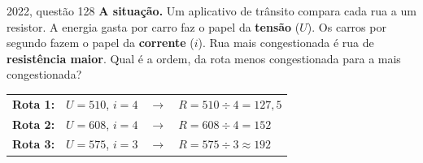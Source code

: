 \begin{enemreal}{2022, questão 128}
\textbf{A situação.} Um aplicativo de trânsito compara cada rua a um resistor. A energia gasta por carro faz o papel da \textbf{tensão} ($U$).
Os carros por segundo fazem o papel da \textbf{corrente} ($i$). Rua mais congestionada é rua de \textbf{resistência maior}.
Qual é a ordem, da rota menos congestionada para a mais congestionada?\par\smallskip
\renewcommand{\arraystretch}{1.15}
\begin{tabular}{@{}llll@{}}
\textbf{\color{tema}Rota 1:} & $U = 510$, $i = 4$ & $\rightarrow$ & $R = 510 \div 4 = 127{,}5$\\
\textbf{\color{tema}Rota 2:} & $U = 608$, $i = 4$ & $\rightarrow$ & $R = 608 \div 4 = 152$\\
\textbf{\color{tema}Rota 3:} & $U = 575$, $i = 3$ & $\rightarrow$ & $R = 575 \div 3 \approx 192$\\
\end{tabular}
\end{enemreal}


